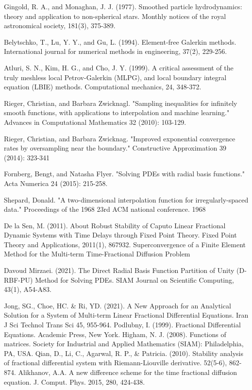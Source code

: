 \documentclass[9pt]{article}
\numberwithin{equation}{section}
\begin{document}
\begin{thebibliography}{25}
 Gingold, R. A., and Monaghan, J. J. (1977). Smoothed particle hydrodynamics: theory and application to non-spherical stars. Monthly notices of the royal astronomical society, 181(3), 375-389.

 Belytschko, T., Lu, Y. Y., and Gu, L. (1994). Element‐free Galerkin methods. International journal for numerical methods in engineering, 37(2), 229-256.

 Atluri, S. N., Kim, H. G., and Cho, J. Y. (1999). A critical assessment of the truly meshless local Petrov-Galerkin (MLPG), and local boundary integral equation (LBIE) methods. Computational mechanics, 24, 348-372.

 Rieger, Christian, and Barbara Zwicknagl. "Sampling inequalities for infinitely smooth functions, with applications to interpolation and machine learning." Advances in Computational Mathematics 32 (2010): 103-129.

 Rieger, Christian, and Barbara Zwicknag. "Improved exponential convergence rates by oversampling near the boundary." Constructive Approximation 39 (2014): 323-341

 Fornberg, Bengt, and Natasha Flyer. "Solving PDEs with radial basis functions." Acta Numerica 24 (2015): 215-258.

Shepard, Donald. "A two-dimensional interpolation function for irregularly-spaced data." Proceedings of the 1968 23rd ACM national conference. 1968

 De la Sen, M. (2011). About Robust Stability of Caputo Linear Fractional Dynamic Systems with Time Delays through Fixed Point Theory. Fixed Point Theory and Applications, 2011(1), 867932.
 Superconvergence of a Finite Element Method for the
Multi-term Time-Fractional Diffusion Problem

 Davoud Mirzaei. (2021). The Direct Radial Basis Function Partition of Unity (D-RBF-PU) Method for Solving PDEs. SIAM Journal on Scientific Computing, 43(1), A54-A83.

 Jong, SG., Choe, HC. \& Ri, YD. (2021). A New Approach for an Analytical Solution for a System of Multi-term Linear Fractional Differential Equations. Iran J Sci Technol Trans Sci 45, 955-964.
   Podlubny, I. (1999). Fractional Differential Equations. Academic Press, New York.
 Higham, N. J. (2008). Functions of matrices. Society for Industrial and Applied Mathematics (SIAM): Philadelphia,
PA, USA.
  Qian, D., Li, C., Agarwal, R. P., \& Patricia. (2010). Stability analysis of fractional differential system with Riemann-Liouville derivative. 52(5-6), 862-874.
  Alikhanov, A.A. A new difference scheme for the time fractional diffusion equation.
J. Comput. Phys. 2015, 280, 424-438.
\end{thebibliography}
\end{document}
